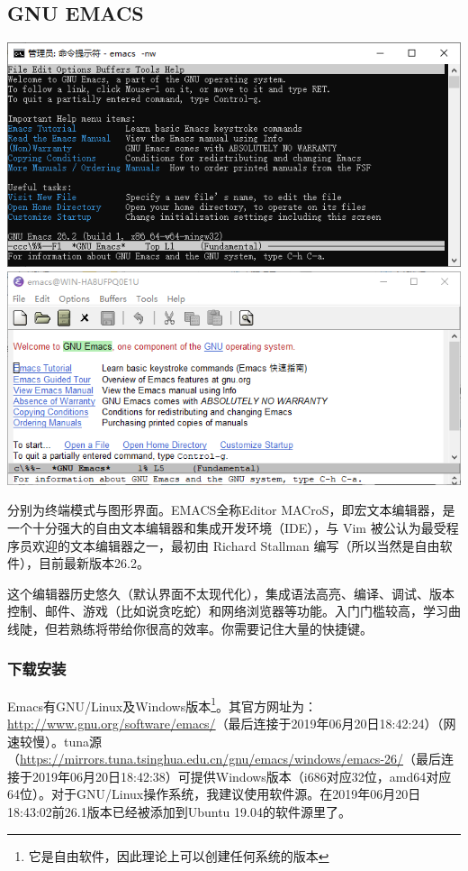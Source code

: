 \documentclass{book}
\begin{document}
\subsection{GNU EMACS}
\begin{center}
	\includegraphics[scale=0.8]{pic/emacs-terminal}\\    \includegraphics[scale=0.8]{pic/Emacs-GUI}
\end{center}
分别为终端模式与图形界面。EMACS全称Editor MACroS，即宏文本编辑器，是一个十分强大的自由文本编辑器和集成开发环境（IDE），与 Vim 被公认为最受程序员欢迎的文本编辑器之一，最初由 Richard Stallman 编写（所以当然是自由软件），目前最新版本26.2。\par
这个编辑器历史悠久（默认界面不太现代化），集成语法高亮、编译、调试、版本控制、邮件、游戏（比如说贪吃蛇）和网络浏览器等功能。入门门槛较高，学习曲线陡，但若熟练将带给你很高的效率。你需要记住大量的快捷键。\par
\subsubsection{下载安装}
Emacs有GNU/Linux及Windows版本\footnote{它是自由软件，因此理论上可以创建任何系统的版本}。其官方网址为：\url{http://www.gnu.org/software/emacs/}（最后连接于2019年06月20日18:42:24）（网速较慢）。tuna源（\url{https://mirrors.tuna.tsinghua.edu.cn/gnu/emacs/windows/emacs-26/}（最后连接于2019年06月20日18:42:38）可提供Windows版本（i686对应32位，amd64对应64位）。对于GNU/Linux操作系统，我建议使用软件源。在2019年06月20日18:43:02前26.1版本已经被添加到Ubuntu 19.04的软件源里了。
\end{document}
